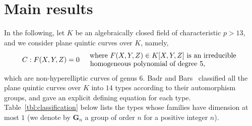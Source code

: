 \documentclass{article}
\theoremstyle{definition}
\begin{document}
\newpage
\section{Main results}\label{sec:main}
In the following, let $K$ be an algebraically closed field of characteristic $p > 13$, and we consider plane quintic curves over $K$, namely,\vspace{-0.4mm}
\[
    C: F(X,Y,Z) = 0 \quad \begin{array}{l}\text{\hspace{-0.2mm}where $F(X,Y,Z) \in K[X,Y,Z]$ is an irreducible}\\[-0.2mm]\text{homogeneous polynomial of degree 5},\end{array}\vspace{0.5mm}
\]
which are non-hyperelliptic curves of genus $6$.
Badr and Bars~\cite{BB} classified all the plane quintic curves over $K$ into $14$ types according to their automorphism groups, and gave an explicit defining equation for each type.
Table~\ref{tbl:classification} below lists the types whose families have dimension at most $1$ (we denote by $\mathbf{G}_n$ a group of order $n$ for a positive integer $n$).\vspace{1mm}
\end{document}
